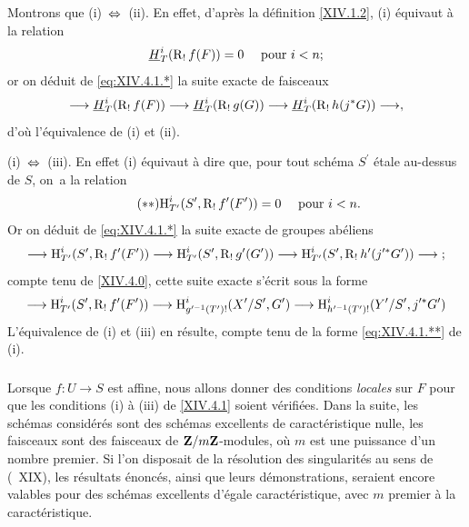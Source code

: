 Montrons que \textup{(i)}~$\Ssi$~\textup{(ii)}. En effet, d'apr\`es la d\'efinition \ref{XIV.1.2}, \textup{(i)} \'equivaut \`a la relation
$$
\underline{H}_{T}^{i}(\operatorname{R}_{!}f(F))=0\quad\textrm{ pour }i<n\textrm{;}$$
or on d\'eduit de \eqref{eq:XIV.4.1.*} la suite exacte de faisceaux
$$
\to\underline{H}_{T}^{i}(\R_{!}f(F))\to\underline{H}_{T}^{i}(\R_{!}g(G))\to\underline{H}_{T}^{i}(\R_{!}h(j^{\ast}G))\to,
$$
d'o\`u l'\'equivalence de \textup{(i)} et \textup{(ii)}.

\textup{(i)}~$\Ssi$~\textup{(iii)}. En effet \textup{(i)} \'equivaut \`a dire que, pour tout sch\'ema $S^{\prime}$ \'etale au-dessus de $S$, on~a la relation
\begin{equation*} \label{eq:XIV.4.1.**} \tag{$**$} {\operatorname{H}_{T^{\prime}}^{i}(S^{\prime}, \operatorname{R}_{!}f^{\prime}(F^{\prime}))=0\quad\textrm{ pour }i<n.}
\end{equation*}
Or on d\'eduit de \eqref{eq:XIV.4.1.*} la suite exacte de groupes ab\'eliens
$$
\to\H_{T^{\prime}}^{i}(S^{\prime}, \R_{!}f^{\prime}(F^{\prime}))\to\H_{T^{\prime}}^{i}(S^{\prime}, \R_{!}g^{\prime}(G^{\prime}))\to \H_{T^{\prime}}^{i}(S^{\prime}, \R_{!}h^{\prime}(j^{\prime\ast}G^{\prime}))\to\;;$$
compte tenu de \ref{XIV.4.0}, cette suite exacte s'\'ecrit sous la forme
$$
\to\H_{T^{\prime}}^{i}(S^{\prime}, \R_{!}f^{\prime}(F^{\prime}))\to\H_{g^{\prime -1}(T^{\prime})!}^{i}(X^{\prime}/S^{\prime}, G^{\prime})\to\H_{h^{\prime -1}(T^{\prime})!}^{i}(Y^{\prime}/S^{\prime}, j^{\prime\ast}G^{\prime})$$
L'\'equivalence de \textup{(i)} et \textup{(iii)} en r\'esulte, compte tenu de la forme \eqref{eq:XIV.4.1.**} de \textup{(i)}.

\setcounter{subsubsection}{-1} \setcounter{subsection}{2}

\subsubsection{} \label{XIV.4.2.0}
Lorsque $f\colon U\to S$ est affine, nous allons donner des conditions \emph{locales} sur $F$ pour que les conditions \textup{(i)} \`a \textup{(iii)} de \ref{XIV.4.1} soient v\'erifi\'ees. Dans la suite, les sch\'emas consid\'er\'es sont des sch\'emas excellents de caract\'eristique nulle, les faisceaux sont des faisceaux de $\mathbf{Z}/m\mathbf{Z}$-modules, o\`u $m$ est une puissance d'un nombre premier. Si l'on disposait de la r\'esolution des singularit\'es au sens de (~XIX), les r\'esultats \'enonc\'es, ainsi que leurs d\'emonstrations, seraient encore valables pour des sch\'emas excellents d'\'egale caract\'eristique, avec $m$ premier \`a la caract\'eristique.

